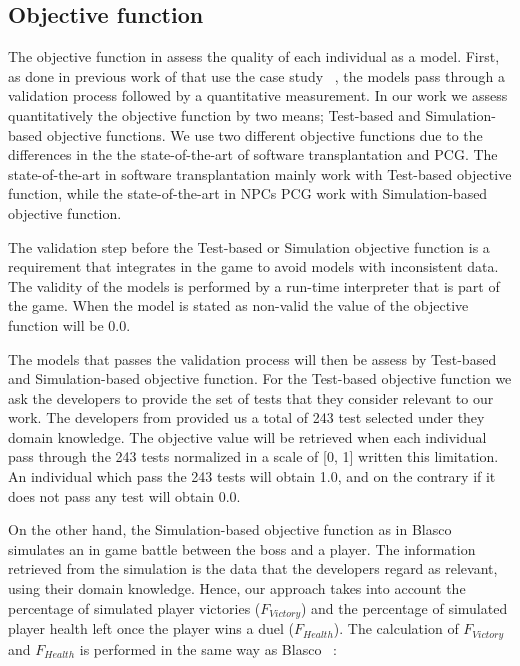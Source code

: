 \subsection{Objective function}

The objective function in \ApproachName{} assess the quality of each individual as a model. First, as done in previous work of that use the case study \CaseStudy{}~\cite{blasco2021evolutionary}, the models pass through a validation process followed by a quantitative measurement. In our work we assess quantitatively the objective function by two means; Test-based and Simulation-based objective functions. We use two different objective functions due to the differences in the the state-of-the-art of software transplantation and PCG. The state-of-the-art in software transplantation mainly work with Test-based objective function, while the state-of-the-art in NPCs PCG work with Simulation-based objective function.

The validation step before the Test-based or Simulation objective function is a requirement that \CaseStudy{} integrates in the game to avoid models with inconsistent data. The validity of the models is performed by a run-time interpreter that is part of the game. When the model is stated as non-valid the value of the objective function will be 0.0.

The models that passes the validation process will then be assess by Test-based and Simulation-based objective function.
For the Test-based objective function we ask the developers to provide the set of tests that they consider relevant to our work. The developers from \CaseStudy{} provided us a total of 243 test selected under they domain knowledge. The objective value will be retrieved when each individual pass through the 243 tests normalized in a scale of [0, 1] written this limitation. An individual which pass the 243 tests will obtain 1.0, and on the contrary if it does not pass any test will obtain 0.0.

On the other hand, the Simulation-based objective function as in Blasco \etal~\cite{blasco2021evolutionary} simulates an in game battle between the boss and a player. The information retrieved from the simulation is the data that the developers regard as relevant, using their domain knowledge. Hence, our approach takes into account the percentage of simulated player victories ($F_{Victory}$) and the percentage of simulated player health left once the player wins a duel ($F_{Health}$).
The calculation of $F_{Victory}$ and $F_{Health}$ is performed in the same
way as Blasco \etal~\cite{blasco2021evolutionary}:

